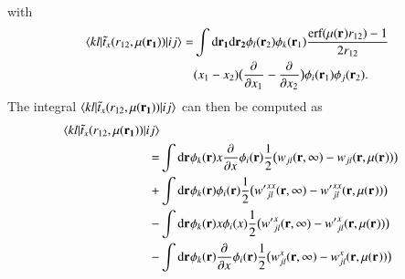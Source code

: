 \documentclass[aip,jcp,reprint,noshowkeys,superscriptaddress]{revtex4-1}
\newcommand{\matelem}[3]{\langle #1 | #2 | #3 \rangle}
\newcommand{\deriv}[3]{\frac{\partial^{#3} #1}{\partial {#2}^{#3}}}
\newcommand{\br}[0]{{\bf {r}}}
\newcommand{\dr}[1]{\text{d}{\bf r_{#1}}}
\newcommand{\mur}[1]{\mu({\bf r_{#1}})}
\begin{document}
with 
\begin{equation}
 \begin{aligned}
  \matelem{kl}{\tilde{t}_x(r_{12},\mur{1})}{ij} = & \int \dr{1} \dr{2} \phi_l(\br_2) \phi_k(\br_1) \frac{\text{erf}(\mur{} r_{12}) - 1}{2 r_{12}} \\
& (x_1 - x_2) \big( \deriv{}{x_1}{} - \deriv{}{x_2}{} \big) \phi_i(\br_1) \phi_j(\br_2).
 \end{aligned}
\end{equation}
The integral $\matelem{kl}{\tilde{t}_x(r_{12},\mur{1})}{ij}$ can then be computed as 
\begin{equation}
 \begin{aligned}
 \matelem{kl}{\tilde{t}_x(r_{12},\mur{1})}{ij} \\
  =& \int \dr{} \phi_k(\br) x \deriv{}{x}{} \phi_i(\br) \frac{1}{2}\big(w_{jl}(\br,\infty) - w_{jl}(\br,\mur{})\big) \\
  +& \int \dr{} \phi_k(\br) \phi_i(\br) \frac{1}{2}\big({w'}_{jl}^{xx}(\br,\infty) - {w'}_{jl}^{xx}(\br,\mur{})\big) \\
  -& \int \dr{} \phi_k(\br) x \phi_i(x) \frac{1}{2} \big( {w'}_{jl}^x(\br,\infty) - {w'}_{jl}^x(\br,\mur{}) \big) \\
  -& \int \dr{} \phi_k(\br) \deriv{}{x}{} \phi_i(\br) \frac{1}{2} \big( {w}_{jl}^x(\br,\infty) - {w}_{jl}^x(\br,\mur{}) \big)
 \end{aligned}
\end{equation}


\end{document}
